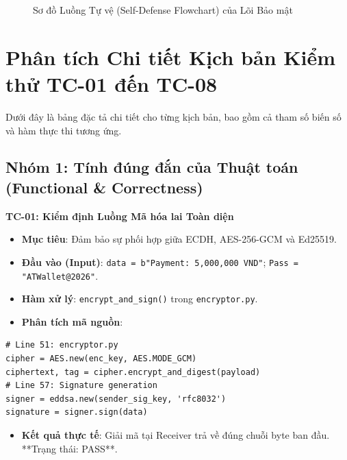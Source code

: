 \documentclass[11pt,a4paper]{article}
\begin{document}
\begin{figure}[H]
    \caption{Sơ đồ Luồng Tự vệ (Self-Defense Flowchart) của Lõi Bảo mật}
\end{figure}

\newpage

\section{Phân tích Chi tiết Kịch bản Kiểm thử TC-01 đến TC-08}

Dưới đây là bảng đặc tả chi tiết cho từng kịch bản, bao gồm cả tham số biến số và hàm thực thi tương ứng.

\subsection{Nhóm 1: Tính đúng đắn của Thuật toán (Functional & Correctness)}

\textbf{TC-01: Kiểm định Luồng Mã hóa lai Toàn diện}
\begin{itemize}[noitemsep]
    \item \textbf{Mục tiêu}: Đảm bảo sự phối hợp giữa ECDH, AES-256-GCM và Ed25519.
    \item \textbf{Đầu vào (Input)}: \texttt{data = b"Payment: 5,000,000 VND"}; \texttt{Pass = "ATWallet@2026"}.
    \item \textbf{Hàm xử lý}: \texttt{encrypt\_and\_sign()} trong \texttt{encryptor.py}.
    \item \textbf{Phân tích mã nguồn}:
\end{itemize}
\begin{lstlisting}
# Line 51: encryptor.py
cipher = AES.new(enc_key, AES.MODE_GCM)
ciphertext, tag = cipher.encrypt_and_digest(payload)
# Line 57: Signature generation
signer = eddsa.new(sender_sig_key, 'rfc8032')
signature = signer.sign(data)
\end{lstlisting}
\begin{itemize}
    \item \textbf{Kết quả thực tế}: Giải mã tại Receiver trả về đúng chuỗi byte ban đầu. **Trạng thái: PASS**.
\end{itemize}
\end{document}
